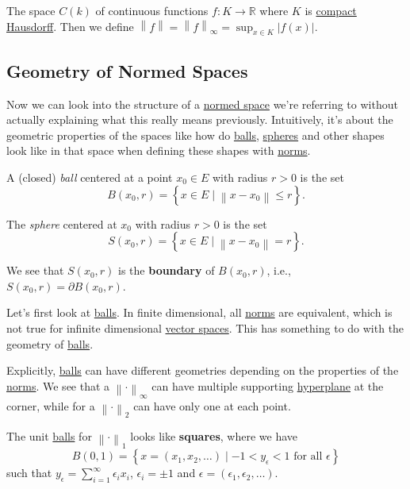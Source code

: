 \begin{eg}
	The space \(C(k)\) of continuous functions \(f\colon K\to \mathbb{R} \) where \(K\) is \hyperref[def:compact]{compact} \hyperref[def:Hausdorff]{Hausdorff}. Then we define \(\left\lVert f\right\rVert = \left\lVert f\right\rVert _\infty = \sup _{x\in K}\left\vert f(x) \right\vert \).
\end{eg}

\subsection{Geometry of Normed Spaces}
Now we can look into the structure of a \hyperref[def:normed-vector-space]{normed space} we're referring to without actually explaining what this really means previously. Intuitively, it's about the geometric properties of the spaces like how do \hyperref[def:ball]{balls}, \hyperref[def:sphere]{spheres} and other shapes look like in that space when defining these shapes with \hyperref[def:norm]{norms}.

\begin{definition}[Ball]\label{def:ball}
	A (closed) \emph{ball} centered at a point \(x_0\in E\) with radius \(r>0\) is the set
	\[
		B(x_0, r) = \left\{ x\in E\mid \left\lVert x - x_0\right\rVert \leq r \right\} .
	\]
\end{definition}

\begin{definition}[Sphere]\label{def:sphere}
	The \emph{sphere} centered at \(x_0\) with radius \(r>0\) is the set
	\[
		S(x_0, r) = \left\{ x\in E\mid \left\lVert x - x_0\right\rVert = r\right\}.
	\]
\end{definition}

\begin{note}
	We see that \(S(x_0, r)\) is the \textbf{boundary} of \(B(x_0, r)\), i.e., \(S(x_0, r) = \partial B(x_0, r)\).
\end{note}

Let's first look at \hyperref[def:ball]{balls}. In finite dimensional, all \hyperref[def:norm]{norms} are equivalent, which is not true for infinite dimensional \hyperref[def:normed-vector-space]{vector spaces}. This has something to do with the geometry of \hyperref[def:ball]{balls}.

Explicitly, \hyperref[def:ball]{balls} can have different geometries depending on the properties of the \hyperref[def:norm]{norms}. We see that a \(\left\lVert \cdot\right\rVert _{\infty}\) can have multiple supporting \hyperref[def:hyperplane]{hyperplane} at the corner, while for a \(\left\lVert \cdot\right\rVert _2\) can have only one at each point.
\begin{remark}
	The unit \hyperref[def:ball]{balls} for \(\left\lVert \cdot\right\rVert _1\) looks like \textbf{squares}, where we have
	\[
		B(0, 1) = \left\{ x = (x_1, x_2, \dots)\mid -1 < y_{\epsilon } < 1 \text{ for all } \epsilon\right\}
	\]
	such that \(y_{\epsilon } = \sum_{i=1}^{\infty} \epsilon _i x_i \), \(\epsilon _i = \pm 1\) and \(\epsilon = (\epsilon _1, \epsilon _2, \dots  )\).
\end{remark}

